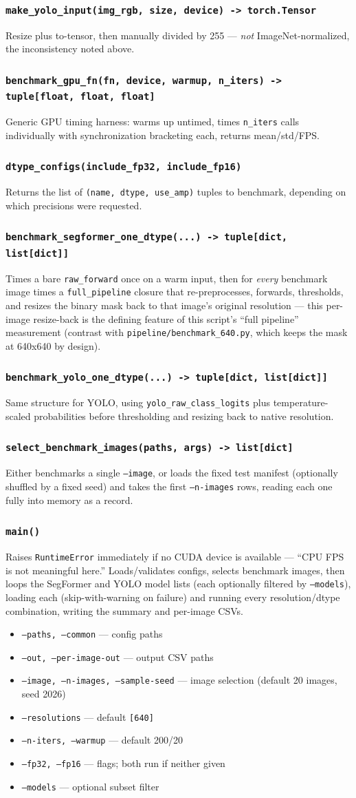 \documentclass[11pt]{article}
\newcommand{\func}[1]{\subsubsection*{\texttt{#1}}}
\newcommand{\cliarg}[2]{\item \texttt{#1} --- #2}
\begin{document}
\func{make\_yolo\_input(img\_rgb, size, device) -> torch.Tensor}
Resize plus to-tensor, then manually divided by 255 --- \emph{not}
ImageNet-normalized, the inconsistency noted above.

\func{benchmark\_gpu\_fn(fn, device, warmup, n\_iters) -> tuple[float, float, float]}
Generic GPU timing harness: warms up untimed, times \texttt{n\_iters} calls
individually with synchronization bracketing each, returns mean/std/FPS.

\func{dtype\_configs(include\_fp32, include\_fp16)}
Returns the list of \texttt{(name, dtype, use\_amp)} tuples to benchmark,
depending on which precisions were requested.

\func{benchmark\_segformer\_one\_dtype(...) -> tuple[dict, list[dict]]}
Times a bare \texttt{raw\_forward} once on a warm input, then for
\emph{every} benchmark image times a \texttt{full\_pipeline} closure that
re-preprocesses, forwards, thresholds, and resizes the binary mask back to that
image's original resolution --- this per-image resize-back is the defining
feature of this script's ``full pipeline'' measurement (contrast with
\texttt{pipeline/benchmark\_640.py}, which keeps the mask at 640x640 by
design).

\func{benchmark\_yolo\_one\_dtype(...) -> tuple[dict, list[dict]]}
Same structure for YOLO, using \texttt{yolo\_raw\_class\_logits} plus
temperature-scaled probabilities before thresholding and resizing back to
native resolution.

\func{select\_benchmark\_images(paths, args) -> list[dict]}
Either benchmarks a single \texttt{--image}, or loads the fixed test manifest
(optionally shuffled by a fixed seed) and takes the first \texttt{--n-images}
rows, reading each one fully into memory as a record.

\func{main()}
Raises \texttt{RuntimeError} immediately if no CUDA device is available ---
``CPU FPS is not meaningful here.'' Loads/validates configs, selects benchmark
images, then loops the SegFormer and YOLO model lists (each optionally filtered
by \texttt{--models}), loading each (skip-with-warning on failure) and running
every resolution/dtype combination, writing the summary and per-image CSVs.

\begin{itemize}[nosep]
\cliarg{--paths, --common}{config paths}
\cliarg{--out, --per-image-out}{output CSV paths}
\cliarg{--image, --n-images, --sample-seed}{image selection (default 20 images, seed 2026)}
\cliarg{--resolutions}{default \texttt{[640]}}
\cliarg{--n-iters, --warmup}{default 200/20}
\cliarg{--fp32, --fp16}{flags; both run if neither given}
\cliarg{--models}{optional subset filter}
\end{itemize}
\end{document}
